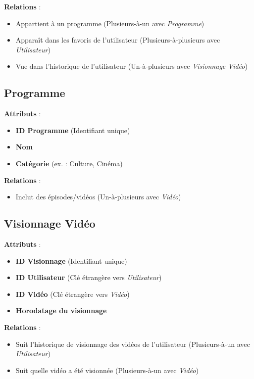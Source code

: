\documentclass[a4paper,12pt]{article}
\begin{document}
\textbf{Relations} :
\begin{itemize}
    \item Appartient à un programme (Plusieurs-à-un avec \textit{Programme})
    \item Apparaît dans les favoris de l'utilisateur (Plusieurs-à-plusieurs avec \textit{Utilisateur})
    \item Vue dans l'historique de l'utilisateur (Un-à-plusieurs avec \textit{Visionnage Vidéo})
\end{itemize}

\subsection{Programme}

\textbf{Attributs} :
\begin{itemize}
    \item \textbf{ID Programme} (Identifiant unique)
    \item \textbf{Nom}
    \item \textbf{Catégorie} (ex. : Culture, Cinéma)
\end{itemize}

\textbf{Relations} :
\begin{itemize}
    \item Inclut des épisodes/vidéos (Un-à-plusieurs avec \textit{Vidéo})
\end{itemize}

\subsection{Visionnage Vidéo}

\textbf{Attributs} :
\begin{itemize}
    \item \textbf{ID Visionnage} (Identifiant unique)
    \item \textbf{ID Utilisateur} (Clé étrangère vers \textit{Utilisateur})
    \item \textbf{ID Vidéo} (Clé étrangère vers \textit{Vidéo})
    \item \textbf{Horodatage du visionnage}
\end{itemize}

\textbf{Relations} :
\begin{itemize}
    \item Suit l'historique de visionnage des vidéos de l'utilisateur (Plusieurs-à-un avec \textit{Utilisateur})
    \item Suit quelle vidéo a été visionnée (Plusieurs-à-un avec \textit{Vidéo})
\end{itemize}
\end{document}

